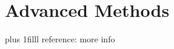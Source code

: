\documentclass[fleqn]{beamer} %
\newcommand{\sectiontitleIV}{Advanced Methods}
\newcommand{\btVFill}{\vskip0pt plus 1filll}
\begin{document}
\section{\sectiontitleIV}	
	\begin{frame}[label=sectionIV] \small
		 

		\btVFill
		\tiny{reference: more info } 
	\end{frame}

\end{document}
